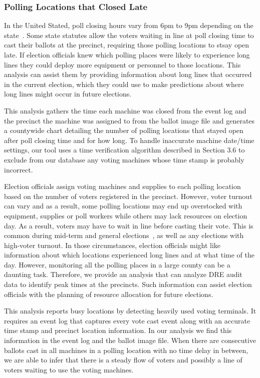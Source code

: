 \subsubsection{Polling Locations that Closed Late}
In the United Stated, poll closing hours vary from 6pm to 9pm depending on the
state~\cite{Info2007}. Some state statutes allow the voters waiting in
line at poll closing time to cast their ballots at the precinct, requiring those
polling locations to stsay open late. If election officials knew which polling
places were likely to 
experience long lines they could deploy more equipment or personnel to
those locations. This analysis can assist them by providing
information about long lines that occurred in the current election, which they
could use to make predictions about where
long lines might occur in future elections.

This analysis gathers the time each machine was closed from the event log and
the precinct the machine was assigned to from the ballot image file
and generates a countywide chart detailing the number of polling
locations that stayed open after poll closing time and for how long. To handle
inaccurate machine date/time settings, our tool uses a time verification
algorithm described in Section 3.6 to exclude from our database any voting
machines whose time stamp is probably incorrect. 

Election officials assign voting machines and supplies to each polling
location based on the number of voters registered in the precinct.
However, voter turnout can vary and as a result, some polling
locations may end up overstocked with equipment, supplies or poll
workers while others may lack resources on election day. As a result,
voters may have to wait in line before casting their vote. This is
common during mid-term and general elections~\cite{Kreitman2010,
  Slade2008, U2010}, as well as any elections with high-voter turnout.
In those circumstances, election officials might like information
about which locations experienced long lines and at what time of the
day. However, monitoring all the polling places in a large county can
be a daunting task. Therefore, we provide an analysis that can analyze
DRE audit data to identify peak times at the precincts. Such
information can assist election officials with the planning of
resource allocation for future elections.

This analysis reports busy locations by detecting heavily used voting terminals. It requires an event log that captures every vote cast event along with an accurate time stamp and precinct location information. In our analysis we find this information in the event log and the ballot image file. When there are consecutive ballots cast in all machines in a polling location with no time delay in between, we are able to infer that there is a steady flow of voters and possibly a line of voters waiting to use the voting machines. 

